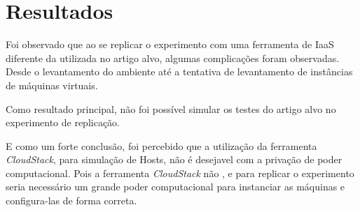 \section{Resultados}

Foi observado que ao se replicar o experimento com uma ferramenta de IaaS diferente da utilizada no artigo alvo, algumas complicações foram observadas. Desde o levantamento do ambiente até a tentativa de levantamento de instâncias de máquinas virtuais.

Como resultado principal, não foi possível simular os testes do artigo alvo no experimento de replicação.

E como um forte conclusão, foi percebido que a utilização da ferramenta \textit{CloudStack}, para simulação de Hosts, não é desejavel com a privação de poder computacional. Pois a ferramenta \textit{CloudStack} não , e para replicar o experimento seria necessário um grande poder computacional para instanciar as máquinas e configura-las de forma correta.
